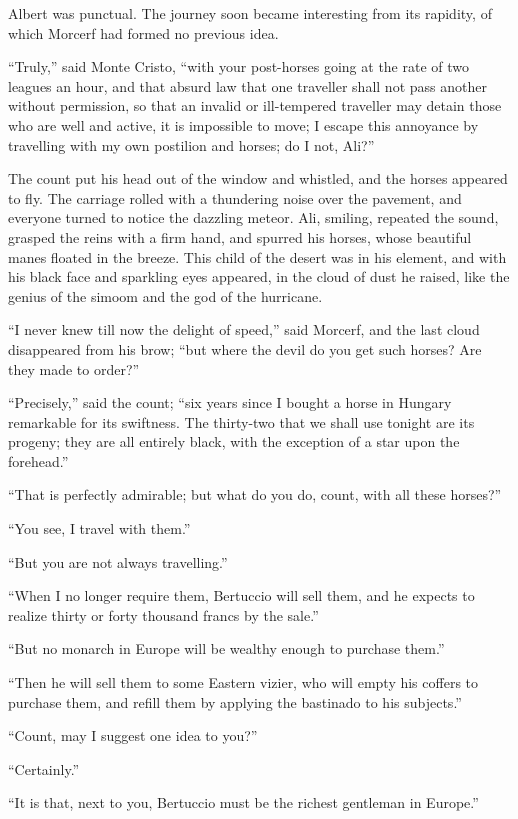 Albert was punctual. The journey soon became interesting from its
rapidity, of which Morcerf had formed no previous idea.

“Truly,” said Monte Cristo, “with your post-horses going at the rate of
two leagues an hour, and that absurd law that one traveller shall not
pass another without permission, so that an invalid or ill-tempered
traveller may detain those who are well and active, it is impossible to
move; I escape this annoyance by travelling with my own postilion and
horses; do I not, Ali?”

The count put his head out of the window and whistled, and the horses
appeared to fly. The carriage rolled with a thundering noise over the
pavement, and everyone turned to notice the dazzling meteor. Ali,
smiling, repeated the sound, grasped the reins with a firm hand, and
spurred his horses, whose beautiful manes floated in the breeze. This
child of the desert was in his element, and with his black face and
sparkling eyes appeared, in the cloud of dust he raised, like the
genius of the simoom and the god of the hurricane.

“I never knew till now the delight of speed,” said Morcerf, and the
last cloud disappeared from his brow; “but where the devil do you get
such horses? Are they made to order?”

“Precisely,” said the count; “six years since I bought a horse in
Hungary remarkable for its swiftness. The thirty-two that we shall use
tonight are its progeny; they are all entirely black, with the
exception of a star upon the forehead.”

“That is perfectly admirable; but what do you do, count, with all these
horses?”

“You see, I travel with them.”

“But you are not always travelling.”

“When I no longer require them, Bertuccio will sell them, and he
expects to realize thirty or forty thousand francs by the sale.”

“But no monarch in Europe will be wealthy enough to purchase them.”

“Then he will sell them to some Eastern vizier, who will empty his
coffers to purchase them, and refill them by applying the bastinado to
his subjects.”

“Count, may I suggest one idea to you?”

“Certainly.”

“It is that, next to you, Bertuccio must be the richest gentleman in
Europe.”

